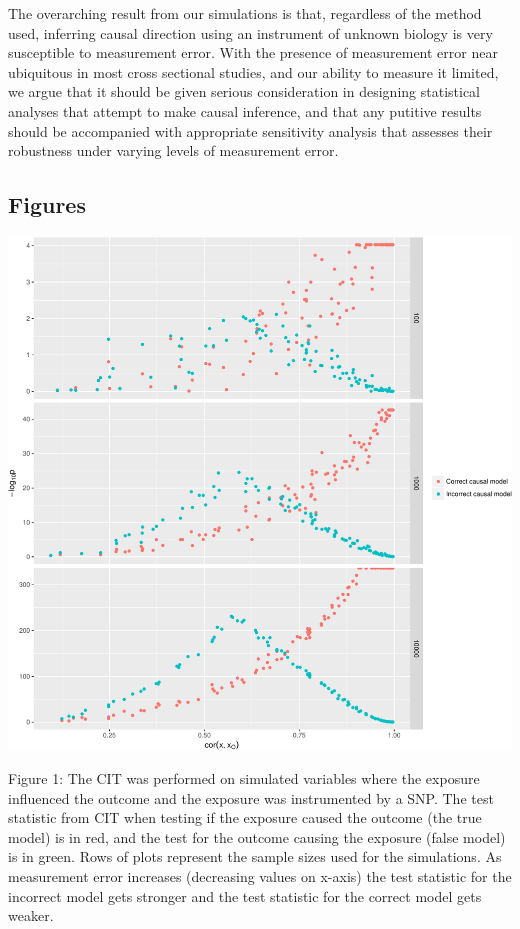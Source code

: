 \documentclass[]{article}
\begin{document}
The overarching result from our simulations is that, regardless of the
method used, inferring causal direction using an instrument of unknown
biology is very susceptible to measurement error. With the presence of
measurement error near ubiquitous in most cross sectional studies, and
our ability to measure it limited, we argue that it should be given
serious consideration in designing statistical analyses that attempt to
make causal inference, and that any putitive results should be
accompanied with appropriate sensitivity analysis that assesses their
robustness under varying levels of measurement error.

\newpage

\subsection{Figures}\label{figures}

\includegraphics{manuscript_files/figure-latex/cit_measurement_error_figure-1.pdf}

Figure 1: The CIT was performed on simulated variables where the
exposure influenced the outcome and the exposure was instrumented by a
SNP. The test statistic from CIT when testing if the exposure caused the
outcome (the true model) is in red, and the test for the outcome causing
the exposure (false model) is in green. Rows of plots represent the
sample sizes used for the simulations. As measurement error increases
(decreasing values on x-axis) the test statistic for the incorrect model
gets stronger and the test statistic for the correct model gets weaker.
\end{document}
